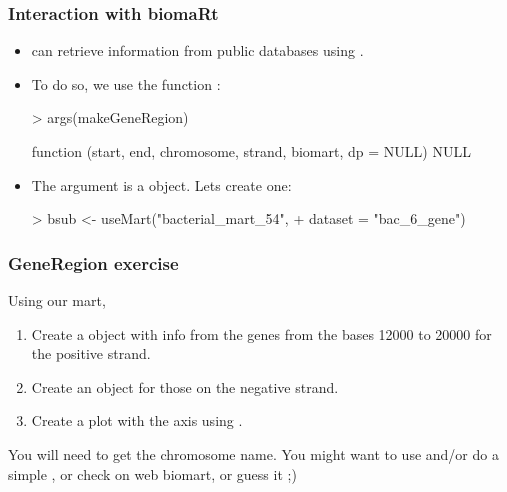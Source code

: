 \begin{frame}
  \frametitle{Interaction with biomaRt}
  \begin{itemize}
  \item {} can retrieve information from public databases using .
  \item To do so, we use the function : \scriptsize
\begin{Schunk}
\begin{Sinput}
> args(makeGeneRegion)
\end{Sinput}
\begin{Soutput}
function (start, end, chromosome, strand, biomart, dp = NULL) 
NULL
\end{Soutput}
\end{Schunk}
\normalsize
  \item The  argument is a  object. Lets create one:
\begin{Schunk}
\begin{Sinput}
> bsub <- useMart("bacterial_mart_54", 
+     dataset = "bac_6_gene")
\end{Sinput}
\end{Schunk}
  \end{itemize}
\end{frame}

\begin{frame}[allowframebreaks]
  \frametitle{GeneRegion exercise}
  Using our  mart,
  \begin{enumerate}
  \item Create a  object  with info from the genes from the bases 12000 to 20000 for the positive strand.
  \item Create an object  for those on the negative strand.
  \item Create a plot with the axis using .
  \end{enumerate}
  You will need to get the chromosome name. You might want to use  and/or do a simple , or check on web biomart, or guess it ;)
\end{frame}

